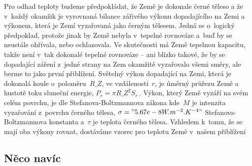 \documentclass[twoside,fykos]{fksserie}
\begin{document}
Pro odhad teploty budeme předpokládat, že Země je dokonale černé 
těleso a že v~každý okamžik je vyrovnaná bilance zářivého výkonu 
dopadajícího na Zemi a výkonem, která je Zemí vyzařovaná jako 
černým tělesem. Jedná se o~logický předpoklad, protože jinak by Země
nebyla v~tepelné rovnováze a~buď by se neustále ohřívala, nebo 
ochlazovala. Ve skutečnosti má Země tepelnou kapacitu, takže není 
v~tak dokonalé tepelné rovnováze -- ani blízko takové, že by se 
dopadající záření z~jedné strany na Zem okamžitě vyzařovalo všemi 
směry, ale berme to jako první přiblížení. Světelný výkon dopadající
na Zemi, která je dokonalá koule o~poloměru~$R\_Z$, ve vzdálenosti~$r$,
je úměrný průřezu Země a hustotě toku sluneční energie, $
P_r = \pi R\_Z^2 S_r \,.  
$
Výkon, který Země vyzáří na svém celém povrchu, je dle 
Stefanova-Boltzmannova zákona 
kde~$M$ je intenzita vyzařování z~povrchu černého tělesa, $\sigma
= "5.67e-8 W.m^{-2}.K^{-4}"$ Stefanova-Boltzmannova konstanta 
a~$\tau$ je teplota černého tělesa. Vzhledem k~tomu, že se mají 
oba výkony rovnat, dostáváme vzorec pro teplotu Země v~našem přiblížení

% 



\subsection{Něco navíc}
\end{document}
